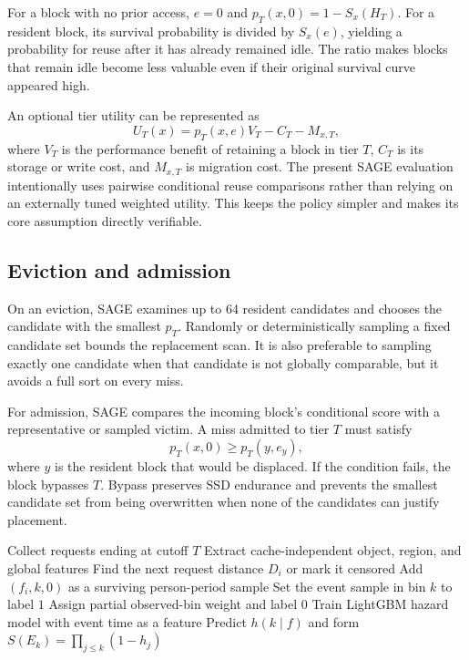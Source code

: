 \documentclass[conference]{IEEEtran}
\begin{document}
For a block with no prior access, $e=0$ and $p_T(x,0)=1-S_x(H_T)$. For a resident block, its survival probability is divided by $S_x(e)$, yielding a probability for reuse after it has already remained idle. The ratio makes blocks that remain idle become less valuable even if their original survival curve appeared high.

An optional tier utility can be represented as
\[
U_T(x)=p_T(x,e)V_T-C_T-M_{x,T},
\]
where $V_T$ is the performance benefit of retaining a block in tier $T$, $C_T$ is its storage or write cost, and $M_{x,T}$ is migration cost. The present SAGE evaluation intentionally uses pairwise conditional reuse comparisons rather than relying on an externally tuned weighted utility. This keeps the policy simpler and makes its core assumption directly verifiable.

\subsection{Eviction and admission}
On an eviction, SAGE examines up to 64 resident candidates and chooses the candidate with the smallest $p_T$. Randomly or deterministically sampling a fixed candidate set bounds the replacement scan. It is also preferable to sampling exactly one candidate when that candidate is not globally comparable, but it avoids a full sort on every miss.

For admission, SAGE compares the incoming block's conditional score with a representative or sampled victim. A miss admitted to tier $T$ must satisfy
\[
p_T(x,0)\geq p_T(y,e_y),
\]
where $y$ is the resident block that would be displaced. If the condition fails, the block bypasses $T$. Bypass preserves SSD endurance and prevents the smallest candidate set from being overwritten when none of the candidates can justify placement.

\begin{algorithm}[t]
\caption{SAGE model training}
\label{alg:train}
\begin{algorithmic}[1]
\State Collect requests ending at cutoff $T$
  \State Extract cache-independent object, region, and global features
  \State Find the next request distance $D_i$ or mark it censored
    \State Add $(f_i,k,0)$ as a surviving person-period sample
  \EndFor
    \State Set the event sample in bin $k$ to label $1$
  \Else
    \State Assign partial observed-bin weight and label $0$
  \EndIf
\EndFor
\State Train LightGBM hazard model with event time as a feature
\State Predict $h(k\mid f)$ and form $S(E_k)=\prod_{j\le k}(1-h_j)$
\end{algorithmic}
\end{algorithm}
\end{document}
